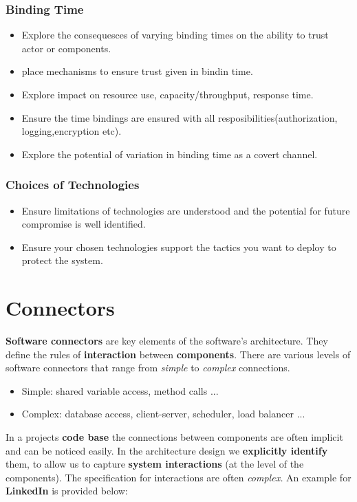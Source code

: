 \documentclass[a4paper]{report}
\begin{document}
\subsection{Binding Time}
\begin{itemize}
\item Explore the consequesces of varying binding times on the ability to trust actor or components.
\item place mechanisms to ensure trust given in bindin time.
\item Explore impact on resource use, capacity/throughput, response time.
\item Ensure the time bindings are ensured with all resposibilities(authorization, logging,encryption etc).
\item Explore the potential of variation in binding time as a covert channel.
\end{itemize}

\subsection{Choices of Technologies}
\begin{itemize}
\item  Ensure limitations of technologies are understood and the potential for future compromise is well identified.
\item Ensure your chosen technologies support the tactics you want to deploy to protect the system.
\end{itemize}

\chapter{Connectors}
\textbf{Software connectors} are key elements of the software's architecture. They define the rules of \textbf{interaction} between \textbf{components}. There are various levels of software connectors that range from \textit{simple} to \textit{complex} connections.
\begin{itemize}
\item Simple: shared variable access, method calls ...
\item Complex: database access, client-server, scheduler, load balancer ...\\
\end{itemize}

In a projects \textbf{code base} the connections between components are often implicit and can be noticed easily. In the architecture design we \textbf{explicitly identify} them, to allow us to capture \textbf{system interactions} (at the level of the components). The specification for interactions are often \textit{complex.} An example for \textbf{LinkedIn} is provided below:\\
\end{document}
